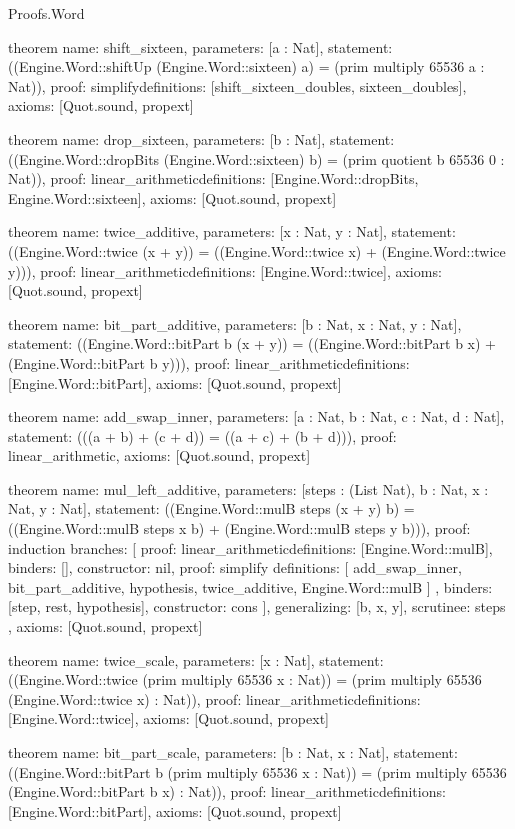 \begin{lexlean}{Proofs.Word}
\begin{semanticmodule}
theorem{
  name: shift_sixteen,
  parameters: [a : Nat],
  statement: ((Engine.Word::shiftUp (Engine.Word::sixteen) a) = (prim multiply 65536 a : Nat)),
  proof: simplify{definitions: [shift_sixteen_doubles, sixteen_doubles]},
  axioms: [Quot.sound, propext]
}

theorem{
  name: drop_sixteen,
  parameters: [b : Nat],
  statement: ((Engine.Word::dropBits (Engine.Word::sixteen) b) = (prim quotient b 65536 0 : Nat)),
  proof: linear_arithmetic{definitions: [Engine.Word::dropBits, Engine.Word::sixteen]},
  axioms: [Quot.sound, propext]
}

theorem{
  name: twice_additive,
  parameters: [x : Nat, y : Nat],
  statement: ((Engine.Word::twice (x + y)) = ((Engine.Word::twice x) + (Engine.Word::twice y))),
  proof: linear_arithmetic{definitions: [Engine.Word::twice]},
  axioms: [Quot.sound, propext]
}

theorem{
  name: bit_part_additive,
  parameters: [b : Nat, x : Nat, y : Nat],
  statement: ((Engine.Word::bitPart b (x + y)) = ((Engine.Word::bitPart b x) + (Engine.Word::bitPart b y))),
  proof: linear_arithmetic{definitions: [Engine.Word::bitPart]},
  axioms: [Quot.sound, propext]
}

theorem{
  name: add_swap_inner,
  parameters: [a : Nat, b : Nat, c : Nat, d : Nat],
  statement: (((a + b) + (c + d)) = ((a + c) + (b + d))),
  proof: linear_arithmetic{},
  axioms: [Quot.sound, propext]
}

theorem{
  name: mul_left_additive,
  parameters: [steps : (List Nat), b : Nat, x : Nat, y : Nat],
  statement: ((Engine.Word::mulB steps (x + y) b) = ((Engine.Word::mulB steps x b) + (Engine.Word::mulB steps y b))),
  proof: induction{
    branches: [
      {proof: linear_arithmetic{definitions: [Engine.Word::mulB]}, binders: [], constructor: nil},
      {
        proof: simplify{
          definitions: [
            add_swap_inner,
            bit_part_additive,
            hypothesis,
            twice_additive,
            Engine.Word::mulB
          ]
        },
        binders: [step, rest, hypothesis],
        constructor: cons
      }
    ],
    generalizing: [b, x, y],
    scrutinee: steps
  },
  axioms: [Quot.sound, propext]
}

theorem{
  name: twice_scale,
  parameters: [x : Nat],
  statement: ((Engine.Word::twice (prim multiply 65536 x : Nat)) = (prim multiply 65536 (Engine.Word::twice x) : Nat)),
  proof: linear_arithmetic{definitions: [Engine.Word::twice]},
  axioms: [Quot.sound, propext]
}

theorem{
  name: bit_part_scale,
  parameters: [b : Nat, x : Nat],
  statement: ((Engine.Word::bitPart b (prim multiply 65536 x : Nat)) = (prim multiply 65536 (Engine.Word::bitPart b x) : Nat)),
  proof: linear_arithmetic{definitions: [Engine.Word::bitPart]},
  axioms: [Quot.sound, propext]
}


\end{semanticmodule}
\end{lexlean}
